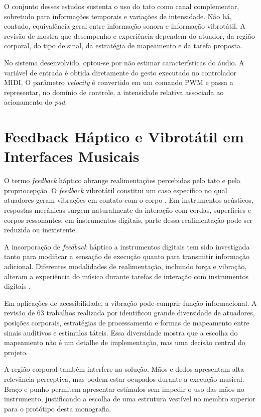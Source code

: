 O conjunto desses estudos sustenta o uso do tato como canal complementar, sobretudo para informações temporais e variações de intensidade. Não há, contudo, equivalência geral entre informação sonora e informação vibrotátil. A revisão de \textcite{paisa2023} mostra que desempenho e experiência dependem do atuador, da região corporal, do tipo de sinal, da estratégia de mapeamento e da tarefa proposta.

No sistema desenvolvido, optou-se por não estimar características do áudio. A variável de entrada é obtida diretamente do gesto executado no controlador MIDI. O parâmetro \textit{velocity} é convertido em um comando PWM e passa a representar, no domínio de controle, a intensidade relativa associada ao acionamento do \textit{pad}.

\section{Feedback Háptico e Vibrotátil em Interfaces Musicais}

O termo \textit{feedback} háptico abrange realimentações percebidas pelo tato e pela propriocepção. O \textit{feedback} vibrotátil constitui um caso específico no qual atuadores geram vibrações em contato com o corpo \cite{paisa2023}. Em instrumentos acústicos, respostas mecânicas surgem naturalmente da interação com cordas, superfícies e corpos ressonantes; em instrumentos digitais, parte dessa realimentação pode ser reduzida ou inexistente.

A incorporação de \textit{feedback} háptico a instrumentos digitais tem sido investigada tanto para modificar a sensação de execução quanto para transmitir informação adicional. Diferentes modalidades de realimentação, incluindo força e vibração, alteram a experiência do músico durante tarefas de interação com instrumentos digitais \cite{young2017}.

Em aplicações de acessibilidade, a vibração pode cumprir função informacional. A revisão de 63 trabalhos realizada por \textcite{paisa2023} identificou grande diversidade de atuadores, posições corporais, estratégias de processamento e formas de mapeamento entre sinais auditivos e estímulos táteis. Essa diversidade mostra que a escolha do mapeamento não é um detalhe de implementação, mas uma decisão central do projeto.

A região corporal também interfere na solução. Mãos e dedos apresentam alta relevância perceptiva, mas podem estar ocupados durante a execução musical. Braço e punho permitem apresentar estímulos sem impedir o uso das mãos no instrumento, justificando a escolha de uma estrutura vestível no membro superior para o protótipo desta monografia.

